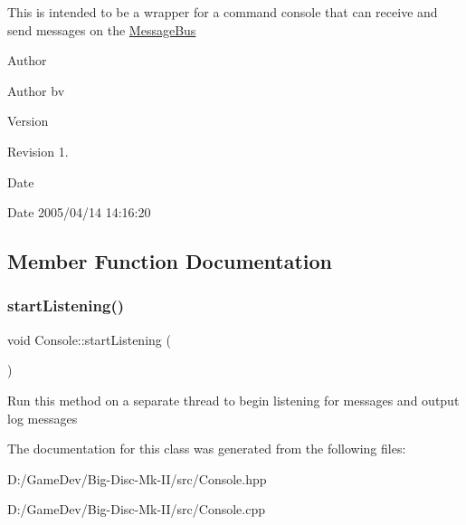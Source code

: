This is intended to be a wrapper for a command console that can receive and send messages on the \mbox{\hyperlink{class_message_bus}{Message\+Bus}}

\begin{DoxyAuthor}{Author}

\end{DoxyAuthor}
\begin{DoxyParagraph}{Author}
bv 
\end{DoxyParagraph}


\begin{DoxyVersion}{Version}

\end{DoxyVersion}
\begin{DoxyParagraph}{Revision}
1. 
\end{DoxyParagraph}


\begin{DoxyDate}{Date}

\end{DoxyDate}
\begin{DoxyParagraph}{Date}
2005/04/14 14\+:16\+:20 
\end{DoxyParagraph}


\subsection{Member Function Documentation}
\mbox{\label{class_console_a6bd41db211cca0b244841a9e788aee3c}} 
\subsubsection{\texorpdfstring{startListening()}{startListening()}}
{\footnotesize\ttfamily void Console\+::start\+Listening (\begin{DoxyParamCaption}{ }\end{DoxyParamCaption})}

Run this method on a separate thread to begin listening for messages and output log messages 

The documentation for this class was generated from the following files\+:\begin{DoxyCompactItemize}
\item 
D\+:/\+Game\+Dev/\+Big-\/\+Disc-\/\+Mk-\/\+I\+I/src/Console.\+hpp\item 
D\+:/\+Game\+Dev/\+Big-\/\+Disc-\/\+Mk-\/\+I\+I/src/Console.\+cpp\end{DoxyCompactItemize}
